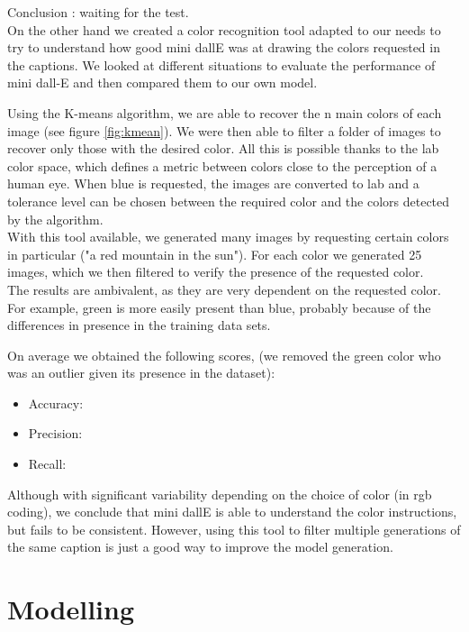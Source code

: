 \documentclass{article}
\begin{document}
Conclusion : waiting for the test.\\

On the other hand we created a color recognition tool adapted to our needs to try to understand how good mini dallE was at drawing the colors requested in the captions. We looked at different situations to evaluate the performance of mini dall-E and then compared them to our own model.

Using the K-means algorithm, we are able to recover the n main colors of each image (see figure \ref{fig:kmean}). We were then able to filter a folder of images to recover only those with the desired color. All this is possible thanks to the lab color space, which defines a metric between colors close to the perception of a human eye. When blue is requested, the images are converted to lab and a tolerance level can be chosen between the required color and the colors detected by the algorithm.\\

With this tool available, we generated many images by requesting certain colors in particular ("a red mountain in the sun"). For each color we generated 25 images, which we then filtered to verify the presence of the requested color.\\

The results are ambivalent, as they are very dependent on the requested color. For example, green is more easily present than blue, probably because of the differences in presence in the training data sets.

On average we obtained the following scores, (we removed the green color who was an outlier given its presence in the dataset): 
\begin{itemize}
    \item Accuracy: 
    \item Precision: 
    \item Recall: 
\end{itemize}

Although with significant variability depending on the choice of color (in rgb coding), we conclude that mini dallE is able to understand the color instructions, but fails to be consistent. However, using this tool to filter multiple generations of the same caption is just a good way to improve the model generation.




\pagebreak

\section{Modelling}
\end{document}
